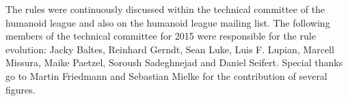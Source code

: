 The rules were continuously discussed within the technical committee of the humanoid league and also on the humanoid league mailing list. The following members of the technical committee for 2015 were responsible for the rule evolution: Jacky Baltes, Reinhard Gerndt, Sean Luke, Luis
F. Lupian, Marcell Missura, Maike Paetzel, Soroush Sadeghnejad and Daniel Seifert. Special thanks go to Martin Friedmann and Sebastian Mielke for the contribution of several figures.
